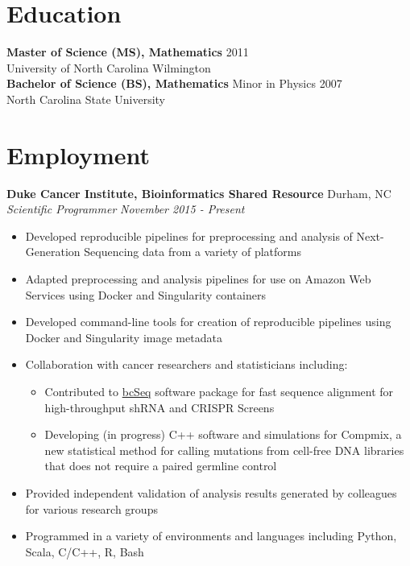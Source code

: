 \documentclass[11pt]{article}
\begin{document}

\section*{Education}

{\bf Master of Science (MS), Mathematics} \hfill 2011\\
University of North Carolina Wilmington
\vspace{5pt}\\
\noindent
{\bf Bachelor of Science (BS), Mathematics} Minor in Physics \hfill 2007\\
North Carolina State University


\section*{Employment}

\noindent
{\bf Duke Cancer Institute, Bioinformatics Shared Resource} \hfill Durham, NC\\
{\it Scientific Programmer} \hfill {\it November 2015 - Present}

\begin{itemize}
\setlength{\itemsep}{1pt}

\item Developed reproducible pipelines for preprocessing
  and analysis of Next-Generation Sequencing data
  from a variety of platforms


\item Adapted preprocessing and analysis pipelines for use on
 Amazon Web Services using Docker and Singularity containers

\item Developed command-line tools for creation of reproducible pipelines
  using Docker and Singularity image metadata

\item Collaboration with cancer researchers and statisticians including:
  \begin{itemize}

    \item Contributed to \href{https://github.com/jl354/bcSeq}{bcSeq} software
    package for fast sequence alignment for high-throughput shRNA and CRISPR Screens

    \item Developing (in progress) C++ software and simulations for Compmix, a new statistical
      method for calling mutations from cell-free DNA libraries that does not
      require a paired germline control

  \end{itemize}

\item Provided independent validation of analysis results generated by colleagues
  for various research groups

\item Programmed in a variety of environments and languages including
 Python, Scala, C/C++, R, Bash

\end{itemize}
\vspace{10pt}
\end{document}
